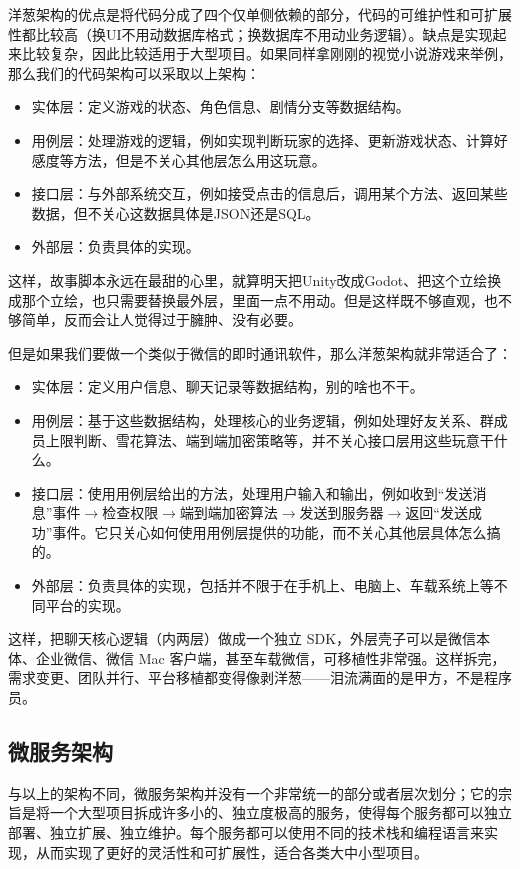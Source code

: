 \documentclass[../main.tex]{subfiles}
\begin{document}
洋葱架构的优点是将代码分成了四个仅单侧依赖的部分，代码的可维护性和可扩展性都比较高（换UI不用动数据库格式；换数据库不用动业务逻辑）。缺点是实现起来比较复杂，因此比较适用于大型项目。如果同样拿刚刚的视觉小说游戏来举例，那么我们的代码架构可以采取以上架构：
\begin{itemize}
  \item 实体层：定义游戏的状态、角色信息、剧情分支等数据结构。
  \item 用例层：处理游戏的逻辑，例如实现判断玩家的选择、更新游戏状态、计算好感度等方法，但是不关心其他层怎么用这玩意。
  \item 接口层：与外部系统交互，例如接受点击的信息后，调用某个方法、返回某些数据，但不关心这数据具体是JSON还是SQL。
  \item 外部层：负责具体的实现。
\end{itemize}
这样，故事脚本永远在最甜的心里，就算明天把Unity改成Godot、把这个立绘换成那个立绘，也只需要替换最外层，里面一点不用动。但是这样既不够直观，也不够简单，反而会让人觉得过于臃肿、没有必要。

但是如果我们要做一个类似于微信的即时通讯软件，那么洋葱架构就非常适合了：
\begin{itemize}
  \item 实体层：定义用户信息、聊天记录等数据结构，别的啥也不干。
  \item 用例层：基于这些数据结构，处理核心的业务逻辑，例如处理好友关系、群成员上限判断、雪花算法、端到端加密策略等，并不关心接口层用这些玩意干什么。
  \item 接口层：使用用例层给出的方法，处理用户输入和输出，例如收到“发送消息”事件$\rightarrow$检查权限$\rightarrow$端到端加密算法$\rightarrow$发送到服务器$\rightarrow$返回“发送成功”事件。它只关心如何使用用例层提供的功能，而不关心其他层具体怎么搞的。
  \item 外部层：负责具体的实现，包括并不限于在手机上、电脑上、车载系统上等不同平台的实现。
\end{itemize}

这样，把聊天核心逻辑（内两层）做成一个独立 SDK，外层壳子可以是微信本体、企业微信、微信 Mac 客户端，甚至车载微信，可移植性非常强。这样拆完，需求变更、团队并行、平台移植都变得像剥洋葱——泪流满面的是甲方，不是程序员。

\subsection{微服务架构}

与以上的架构不同，微服务架构并没有一个非常统一的部分或者层次划分；它的宗旨是将一个大型项目拆成许多小的、独立度极高的服务，使得每个服务都可以独立部署、独立扩展、独立维护。每个服务都可以使用不同的技术栈和编程语言来实现，从而实现了更好的灵活性和可扩展性，适合各类大中小型项目。
\end{document}
